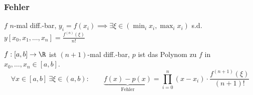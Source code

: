\subsubsection{Fehler}

\inlinetheorem $f$ $n$-mal diff.-bar, $y_i = f(x_i) \implies \exists \xi \in (\min_i x_i, \max_i x_i)$ s.d. $y[x_0,x_1,\ldots,x_n] = \frac{f^{(n)}(\xi)}{n!}$

 $f: [a,b] \to \R$ ist $(n+1)$-mal diff.-bar, $p$ ist das Polynom zu $f$ in $x_0,\ldots,x_n \in [a,b]$. 
$$
    \forall x \in [a,b]\ \exists \xi \in (a,b):\quad\quad \underbrace{f(x)-p(x)}_{\text{Fehler}} = \prod_{i=0}^{n}(x-x_i)\cdot\frac{f^{(n+1)}(\xi)}{(n+1)!}
$$
